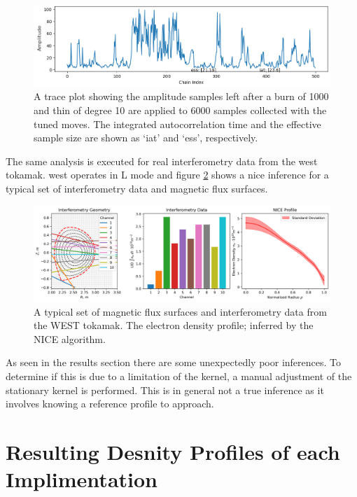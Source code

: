 \begin{figure}[H]
    \centering
    \includegraphics[width=400pt]{images/Final/TraceBurn1000_thin10.png}
    \caption{A trace plot showing the amplitude samples left after a burn of 1000 and thin of degree 10 are applied to 6000 samples collected with the tuned moves. The integrated autocorrelation time and the effective sample size are shown as `iat' and `ess', respectively.}
    \label{fig:tracethin}
\end{figure}

The same analysis is executed for real interferometry data from the \gls{west} tokamak. \gls{west} operates in L mode and figure \ref{fig:interf_nice} shows a \gls{nice} inference for a typical set of interferometry data and magnetic flux surfaces.

\begin{figure}[H]
    \centering
    \includegraphics[width=\textwidth]{images/Final/interferometry_nice.png}
    \caption{A typical set of magnetic flux surfaces and interferometry data from the WEST tokamak. The electron density profile; inferred by the NICE algorithm.}
    \label{fig:interf_nice}
\end{figure}

As seen in the results section there are some unexpectedly poor inferences. To determine if this is due to a limitation of the kernel, a manual adjustment of the stationary kernel is performed. This is in general not a true inference as it involves knowing a reference profile to approach.

\section{Resulting Desnity Profiles of each Implimentation}

